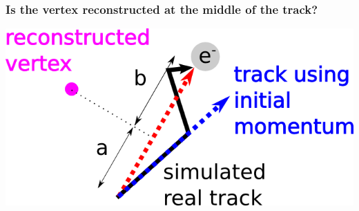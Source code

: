 \documentclass{beamer}
\begin{document}
\begin{frame}
	\frametitle{Is the vertex reconstructed at the middle of the track?}
	\begin{center}
		\includegraphics[height=0.4\textheight]{vertex_distance_definition.png}
	\end{center}
\end{frame}
\end{document}
